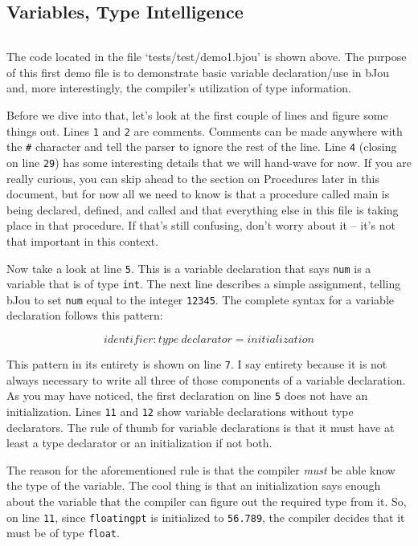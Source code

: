 \documentclass[12pt]{article}
\begin{document}
	\subsection*{Variables, Type Intelligence}
		\begin{centering}
			\inputminted[breaklines, fontsize=\small, baselinestretch=0.8, frame=lines, linenos]{bash}{"../tests/test/demo1.bjou"}
		\end{centering}

		The code located in the file `tests/test/demo1.bjou' is shown above. The purpose of this first demo file is to demonstrate basic variable declaration/use in bJou and, more interestingly, the compiler's utilization of type information.
	
		Before we dive into that, let's look at the first couple of lines and figure some things out. Lines \texttt{1} and \texttt{2} are comments. Comments can be made anywhere with the \texttt{\#} character and tell the parser to ignore the rest of the line. Line \texttt{4} (closing on line \texttt{29}) has some interesting details that we will hand-wave for now. If you are really curious, you can skip ahead to the section on Procedures later in this document, but for now all we need to know is that a procedure called main is being declared, defined, and called and that everything else in this file is taking place in that procedure. If that's still confusing, don't worry about it -- it's not that important in this context.

		Now take a look at line \texttt{5}. This is a variable declaration that says \texttt{num} is a variable that is of type \texttt{int}. The next line describes a simple assignment, telling bJou to set \texttt{num} equal to the integer \texttt{12345}. The complete syntax for a variable declaration follows this pattern:
	
		$$identifier : type\ declarator = initialization$$
		
		This pattern in its entirety is shown on line \texttt{7}. I say entirety because it is not always necessary to write all three of those components of a variable declaration. As you may have noticed, the first declaration on line \texttt{5} does not have an initialization. Lines \texttt{11} and \texttt{12} show variable declarations without type declarators. The rule of thumb for variable declarations is that it must have at least a type declarator or an initialization if not both.
	
		The reason for the aforementioned rule is that the compiler \emph{must} be able know the type of the variable. The cool thing is that an initialization says enough about the variable that the compiler can figure out the required type from it. So, on line \texttt{11}, since \texttt{floatingpt} is initialized to \texttt{56.789}, the compiler decides that it must be of type \texttt{float}.
	
\end{document}
